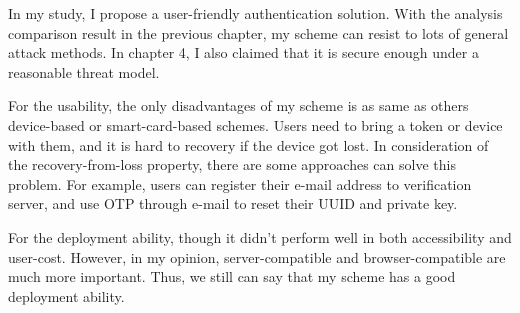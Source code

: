 \begin{CJK}{Bg5}{bsmi}
In my study, I propose a user-friendly authentication solution. With the analysis comparison result in the previous chapter, my scheme can resist to lots of general attack methods. In chapter 4, I also claimed that it is secure enough under a reasonable threat model. 

For the usability, the only disadvantages of my scheme is as same as others device-based or smart-card-based schemes. Users need to bring a token or device with them, and it is hard to recovery if the device got lost. In consideration of the recovery-from-loss property, there are some approaches can solve this problem. For example, users can register their e-mail address to verification server, and use OTP through e-mail to reset their UUID and private key.

For the deployment ability, though it didn't perform well in both accessibility and user-cost. However, in my opinion, server-compatible and browser-compatible are much more important. Thus, we still can say that my scheme has a good deployment ability.

\end{CJK}